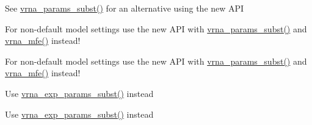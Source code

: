 \begin{DoxyRefList}
\item[\label{deprecated__deprecated000034}%
\hypertarget{deprecated__deprecated000034}{}%
Global \hyperlink{group__mfe__cofold_gaaadbd28b4e428710529ab4098fdacad3}{update\-\_\-cofold\-\_\-params\-\_\-par} (vrna\-\_\-param\-\_\-t $\ast$parameters)]See \hyperlink{group__energy__parameters_ga5d1909208f7ea3baa98b75afaa1f62ca}{vrna\-\_\-params\-\_\-subst()} for an alternative using the new A\-P\-I  
\item[\label{deprecated__deprecated000067}%
\hypertarget{deprecated__deprecated000067}{}%
Global \hyperlink{group__mfe__fold__single_ga41bf8f6fa15b94471f7095cad9f0ccf3}{update\-\_\-fold\-\_\-params} (void)]For non-\/default model settings use the new A\-P\-I with \hyperlink{group__energy__parameters_ga5d1909208f7ea3baa98b75afaa1f62ca}{vrna\-\_\-params\-\_\-subst()} and \hyperlink{group__mfe__fold_gabd3b147371ccf25c577f88bbbaf159fd}{vrna\-\_\-mfe()} instead! 
\item[\label{deprecated__deprecated000068}%
\hypertarget{deprecated__deprecated000068}{}%
Global \hyperlink{group__mfe__fold__single_gae66dc422efb8f5d56717d92d6002a9f8}{update\-\_\-fold\-\_\-params\-\_\-par} (vrna\-\_\-param\-\_\-t $\ast$parameters)]For non-\/default model settings use the new A\-P\-I with \hyperlink{group__energy__parameters_ga5d1909208f7ea3baa98b75afaa1f62ca}{vrna\-\_\-params\-\_\-subst()} and \hyperlink{group__mfe__fold_gabd3b147371ccf25c577f88bbbaf159fd}{vrna\-\_\-mfe()} instead! 
\item[\label{deprecated__deprecated000098}%
\hypertarget{deprecated__deprecated000098}{}%
Global \hyperlink{group__pf__fold_ga384e927890f9c034ff09fa66da102d28}{update\-\_\-pf\-\_\-params} (int length)]Use \hyperlink{group__energy__parameters_ga8e7ac4fab3b0cc03afbc134eaafb3525}{vrna\-\_\-exp\-\_\-params\-\_\-subst()} instead


\item[\label{deprecated__deprecated000099}%
\hypertarget{deprecated__deprecated000099}{}%
Global \hyperlink{group__pf__fold_gaafe2d1b21f5418b123b088aa395e827d}{update\-\_\-pf\-\_\-params\-\_\-par} (int length, vrna\-\_\-exp\-\_\-param\-\_\-t $\ast$parameters)]Use \hyperlink{group__energy__parameters_ga8e7ac4fab3b0cc03afbc134eaafb3525}{vrna\-\_\-exp\-\_\-params\-\_\-subst()} instead



\end{DoxyRefList}

